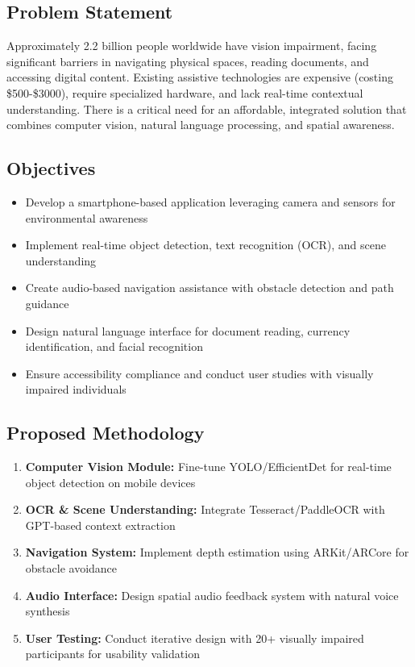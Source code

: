 \documentclass[12pt,a4paper]{article}
\begin{document}
\subsection{Problem Statement}
Approximately 2.2 billion people worldwide have vision impairment, facing significant barriers in navigating physical spaces, reading documents, and accessing digital content. Existing assistive technologies are expensive (costing \$500-\$3000), require specialized hardware, and lack real-time contextual understanding. There is a critical need for an affordable, integrated solution that combines computer vision, natural language processing, and spatial awareness.

\subsection{Objectives}
\begin{itemize}[leftmargin=*]
    \item Develop a smartphone-based application leveraging camera and sensors for environmental awareness
    \item Implement real-time object detection, text recognition (OCR), and scene understanding
    \item Create audio-based navigation assistance with obstacle detection and path guidance
    \item Design natural language interface for document reading, currency identification, and facial recognition
    \item Ensure accessibility compliance and conduct user studies with visually impaired individuals
\end{itemize}

\subsection{Proposed Methodology}
\begin{enumerate}[leftmargin=*]
    \item \textbf{Computer Vision Module:} Fine-tune YOLO/EfficientDet for real-time object detection on mobile devices
    \item \textbf{OCR \& Scene Understanding:} Integrate Tesseract/PaddleOCR with GPT-based context extraction
    \item \textbf{Navigation System:} Implement depth estimation using ARKit/ARCore for obstacle avoidance
    \item \textbf{Audio Interface:} Design spatial audio feedback system with natural voice synthesis
    \item \textbf{User Testing:} Conduct iterative design with 20+ visually impaired participants for usability validation
\end{enumerate}
\end{document}
